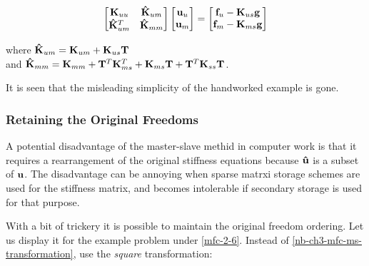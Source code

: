 \begin{equation}
    \begin{bmatrix}
        \mathbf{K}_{uu} & \mathbf{\hat{K}}_{um} \\
        \mathbf{\hat{K}}_{um}^T &
        \mathbf{\hat{K}}_{mm}
    \end{bmatrix}
    \begin{bmatrix}
        \mathbf{u}_u \\
        \mathbf{u}_m
    \end{bmatrix}
    = \begin{bmatrix}
        \mathbf{f}_u - \mathbf{K}_{us} \mathbf{g} \\
        \mathbf{f}_m - \mathbf{K}_{ms} \mathbf{g}
    \end{bmatrix}
\end{equation}

where $ \mathbf{\hat{K}}_{um} = \mathbf{K}_{um} + \mathbf{K}_{us} \mathbf{T} $ \\
and $ \mathbf{\hat{K}}_{mm} = \mathbf{K}_{mm} + \mathbf{T}^T \mathbf{K}_{ms}^T
+ \mathbf{K}_{ms} \mathbf{T} + \mathbf{T}^T \mathbf{K}_{ss} \mathbf{T} $.

It is seen that the misleading simplicity of the handworked example is gone.


\subsubsection{Retaining the Original Freedoms}

A potential disadvantage of the master-slave methid in computer work is that it
requires a rearrangement of the original stiffness equations because
$ \mathbf{\hat{u}} $ is a subset of $ \mathbf{u} $. The disadvantage can be
annoying when sparse matrxi storage schemes are used for the stiffness matrix,
and becomes intolerable if secondary storage is used for that purpose.

With a bit of trickery it is possible to maintain the original freedom ordering.
Let us display it for the example problem under \eqref{mfc-2-6}.
Instead of \eqref{nb-ch3-mfc-ms-transformation}, use the \textit{square} transformation:

